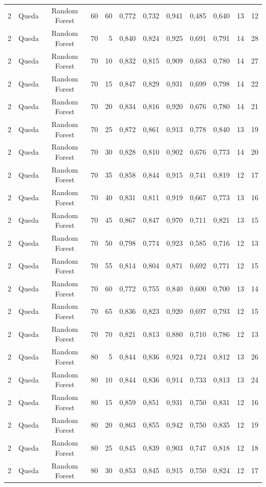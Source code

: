 \begin{longtable}{ccclrrrrrrrr}
2 & Queda & Random Forest & 60 & 60 & 0,772 & 0,732 & 0,941 & 0,485 & 0,640 & 13 & 12 \\
2 & Queda & Random Forest & 70 & 5 & 0,840 & 0,824 & 0,925 & 0,691 & 0,791 & 14 & 28 \\
2 & Queda & Random Forest & 70 & 10 & 0,832 & 0,815 & 0,909 & 0,683 & 0,780 & 14 & 27 \\
2 & Queda & Random Forest & 70 & 15 & 0,847 & 0,829 & 0,931 & 0,699 & 0,798 & 14 & 22 \\
2 & Queda & Random Forest & 70 & 20 & 0,834 & 0,816 & 0,920 & 0,676 & 0,780 & 14 & 21 \\
2 & Queda & Random Forest & 70 & 25 & 0,872 & 0,861 & 0,913 & 0,778 & 0,840 & 13 & 19 \\
2 & Queda & Random Forest & 70 & 30 & 0,828 & 0,810 & 0,902 & 0,676 & 0,773 & 14 & 20 \\
2 & Queda & Random Forest & 70 & 35 & 0,858 & 0,844 & 0,915 & 0,741 & 0,819 & 12 & 17 \\
2 & Queda & Random Forest & 70 & 40 & 0,831 & 0,811 & 0,919 & 0,667 & 0,773 & 13 & 16 \\
2 & Queda & Random Forest & 70 & 45 & 0,867 & 0,847 & 0,970 & 0,711 & 0,821 & 13 & 15 \\
2 & Queda & Random Forest & 70 & 50 & 0,798 & 0,774 & 0,923 & 0,585 & 0,716 & 12 & 13 \\
2 & Queda & Random Forest & 70 & 55 & 0,814 & 0,804 & 0,871 & 0,692 & 0,771 & 12 & 15 \\
2 & Queda & Random Forest & 70 & 60 & 0,772 & 0,755 & 0,840 & 0,600 & 0,700 & 13 & 14 \\
2 & Queda & Random Forest & 70 & 65 & 0,836 & 0,823 & 0,920 & 0,697 & 0,793 & 12 & 15 \\
2 & Queda & Random Forest & 70 & 70 & 0,821 & 0,813 & 0,880 & 0,710 & 0,786 & 12 & 13 \\
2 & Queda & Random Forest & 80 & 5 & 0,844 & 0,836 & 0,924 & 0,724 & 0,812 & 13 & 26 \\
2 & Queda & Random Forest & 80 & 10 & 0,844 & 0,836 & 0,914 & 0,733 & 0,813 & 13 & 24 \\
2 & Queda & Random Forest & 80 & 15 & 0,859 & 0,851 & 0,931 & 0,750 & 0,831 & 12 & 16 \\
2 & Queda & Random Forest & 80 & 20 & 0,863 & 0,855 & 0,942 & 0,750 & 0,835 & 12 & 19 \\
2 & Queda & Random Forest & 80 & 25 & 0,845 & 0,839 & 0,903 & 0,747 & 0,818 & 12 & 18 \\
2 & Queda & Random Forest & 80 & 30 & 0,853 & 0,845 & 0,915 & 0,750 & 0,824 & 12 & 17 \\

\end{longtable}
